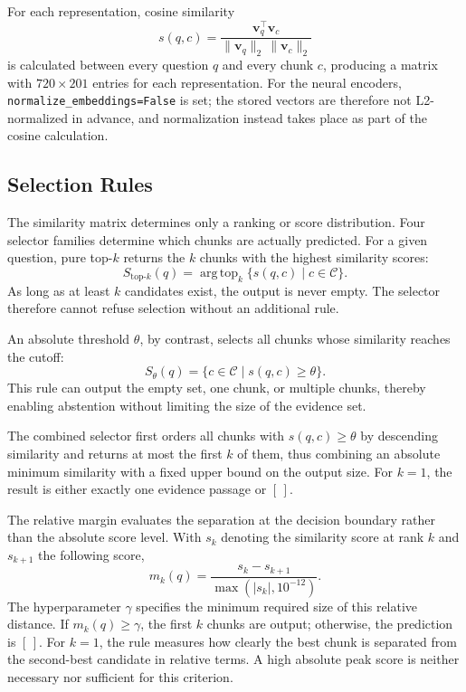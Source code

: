 \documentclass[11pt]{article}
\begin{document}
For each representation, cosine similarity
\begin{equation}
s(q,c)=\frac{\mathbf{v}_q^\top\mathbf{v}_c}
{\lVert\mathbf{v}_q\rVert_2\,\lVert\mathbf{v}_c\rVert_2}
\end{equation}
is calculated between every question $q$ and every chunk $c$, producing a matrix with $720\times201$ entries for each representation. For the neural encoders, \texttt{normalize\_embeddings=False} is set; the stored vectors are therefore not L2-normalized in advance, and normalization instead takes place as part of the cosine calculation.

\subsection{Selection Rules}

The similarity matrix determines only a ranking or score distribution. Four selector families determine which chunks are actually predicted. For a given question, pure top-$k$ returns the $k$ chunks with the highest similarity scores:
\begin{equation}
S_{\mathrm{top}\text{-}k}(q)=\operatorname{arg\,top}_{k}
\{s(q,c)\mid c\in\mathcal{C}\}.
\end{equation}
As long as at least $k$ candidates exist, the output is never empty. The selector therefore cannot refuse selection without an additional rule.

An absolute threshold $\theta$, by contrast, selects all chunks whose similarity reaches the cutoff:
\begin{equation}
S_{\theta}(q)=\{c\in\mathcal{C}\mid s(q,c)\geq\theta\}.
\end{equation}
This rule can output the empty set, one chunk, or multiple chunks, thereby enabling abstention without limiting the size of the evidence set.

The combined selector first orders all chunks with $s(q,c)\geq\theta$ by descending similarity and returns at most the first $k$ of them, thus combining an absolute minimum similarity with a fixed upper bound on the output size. For $k=1$, the result is either exactly one evidence passage or $[\,]$.

The relative margin evaluates the separation at the decision boundary rather than the absolute score level. With $s_k$ denoting the similarity score at rank $k$ and $s_{k+1}$ the following score,
\begin{equation}
m_k(q)=\frac{s_k-s_{k+1}}{\max(|s_k|,10^{-12})}.
\end{equation}
The hyperparameter $\gamma$ specifies the minimum required size of this relative distance. If $m_k(q)\geq\gamma$, the first $k$ chunks are output; otherwise, the prediction is $[\,]$. For $k=1$, the rule measures how clearly the best chunk is separated from the second-best candidate in relative terms. A high absolute peak score is neither necessary nor sufficient for this criterion.
\end{document}
